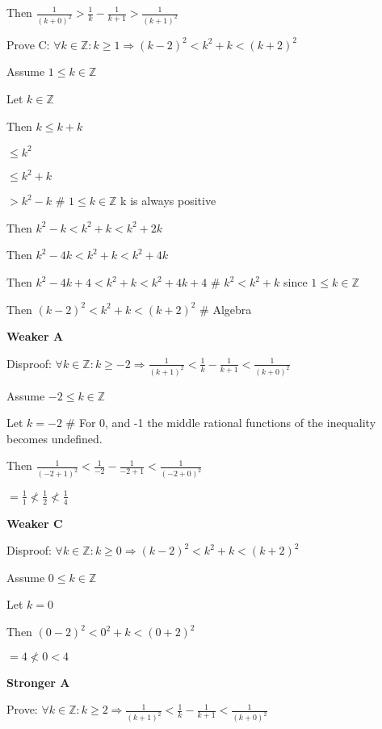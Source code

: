 \documentclass[11pt, oneside]{article}   	%
\begin{document}
\indent \indent Then $ \frac{1}{(k+0)^2} >\frac{1}{k} - \frac{1}{k+1} > \frac{1}{(k+1)^2}$ 


\break
\noindent Prove C: $\forall k \in \mathbb{Z} : k \geq 1 \Rightarrow (k-2)^2 <  k^2 + k < (k+2)^2$

Assume $ 1 \leq k \in \mathbb{Z}$ 

Let $ k \in \mathbb{Z} $

\indent \indent Then $k \leq  k + k $

\indent \indent \indent  $ \leq k^2 $

\indent \indent \indent $\leq k^2 + k$ 

\indent \indent \indent $ > k^2 - k$ 
\# $1 \leq k \in \mathbb{Z}$ k is always positive

\indent \indent Then $ k^2 - k < k^2 + k < k^2 + 2k$ 

\indent \indent Then $ k^2 - 4k < k^2 + k < k^2 + 4k$ 

\indent \indent Then $ k^2 - 4k +4 < k^2 + k < k^2 + 4k + 4$ 
\# $k^2 < k^2 + k $ since $1 \leq k \in \mathbb{Z}$ 

\indent \indent Then $ (k-2)^2 <  k^2 + k < (k+2)^2$
\# Algebra


\noindent \textbf{Weaker A}

Disproof: $\forall k \in \mathbb{Z} : k \geq -2 \Rightarrow \frac{1}{(k+1)^2} <  \frac{1}{k} - \frac{1}{k+1} < \frac{1}{(k+0)^2}$

Assume $ -2 \leq k \in \mathbb{Z}$ 

Let $ k = -2 $ 
\# For 0, and -1 the middle rational functions of the inequality becomes undefined. 

\indent \indent Then $ \frac{1}{(-2+1)^2} < \frac{1}{-2} - \frac{1}{-2+1} < \frac{1}{(-2+0)^2}$ 

\indent \indent \indent $ = \frac{1}{1} \not< \frac{1}{2} \not< \frac{1}{4}$

\noindent \textbf{Weaker C}

Disproof:  $\forall k \in \mathbb{Z} : k \geq 0 \Rightarrow (k-2)^2 <  k^2 + k < (k+2)^2$

Assume $ 0 \leq k \in \mathbb{Z}$ 

Let $ k = 0 $ 

\indent \indent Then $ (0-2)^2 <  0^2 + k < (0+2)^2$

\indent \indent \indent $ = 4 \not< 0 < 4 $


\noindent \textbf{Stronger A}

Prove: $\forall k \in \mathbb{Z} : k \geq 2 \Rightarrow \frac{1}{(k+1)^2} <  \frac{1}{k} - \frac{1}{k+1} < \frac{1}{(k+0)^2}$
\end{document}
